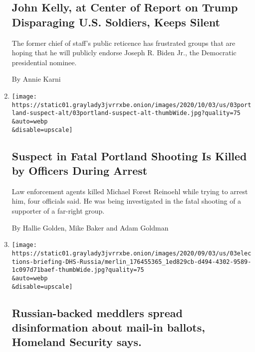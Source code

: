 \begin{enumerate}
  \hypertarget{john-kelly-at-center-of-report-on-trump-disparaging-us-soldiers-keeps-silent}{%
  \subsection{John Kelly, at Center of Report on Trump Disparaging U.S.
  Soldiers, Keeps
  Silent}\label{john-kelly-at-center-of-report-on-trump-disparaging-us-soldiers-keeps-silent}}

  The former chief of staff's public reticence has frustrated groups
  that are hoping that he will publicly endorse Joseph R. Biden Jr., the
  Democratic presidential nominee.

  By Annie Karni
\item
  \href{/2020/09/03/us/michael-reinoehl-arrest-portland-shooting.html}{}

  \texttt{[image: https://static01.graylady3jvrrxbe.onion/images/2020/10/03/us/03portland-suspect-alt/03portland-suspect-alt-thumbWide.jpg?quality=75\\\&auto=webp\\\&disable=upscale]}

  \hypertarget{suspect-in-fatal-portland-shooting-is-killed-by-officers-during-arrest}{%
  \subsection{Suspect in Fatal Portland Shooting Is Killed by Officers
  During
  Arrest}\label{suspect-in-fatal-portland-shooting-is-killed-by-officers-during-arrest}}

  Law enforcement agents killed Michael Forest Reinoehl while trying to
  arrest him, four officials said. He was being investigated in the
  fatal shooting of a supporter of a far-right group.

  By Hallie Golden, Mike Baker and Adam Goldman
\item
  \href{/live/2020/09/03/us/trump-vs-biden/russian-backed-meddlers-spread-disinformation-about-mail-in-ballots-homeland-security-says}{}

  \texttt{[image: https://static01.graylady3jvrrxbe.onion/images/2020/09/03/us/03elections-briefing-DHS-Russia/merlin\_176455365\_1ed829cb-d494-4302-9589-1c097d71baef-thumbWide.jpg?quality=75\\\&auto=webp\\\&disable=upscale]}

  \hypertarget{russian-backed-meddlers-spread-disinformation-about-mail-in-ballots-homeland-security-says}{%
  \subsection{Russian-backed meddlers spread disinformation about
  mail-in ballots, Homeland Security
  says.}\label{russian-backed-meddlers-spread-disinformation-about-mail-in-ballots-homeland-security-says}}


\end{enumerate}
